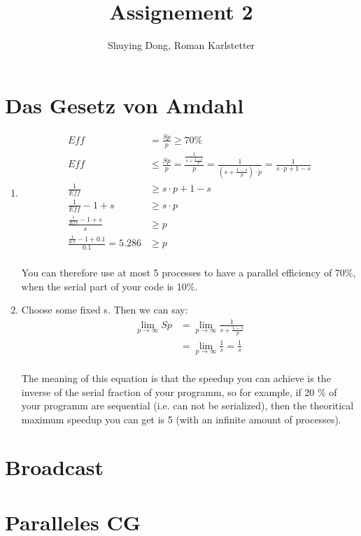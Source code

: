 \documentclass[a4paper,10pt]{article}
\title{Assignement 2}
\author{Shuying Dong, Roman Karlstetter}
\begin{document}
\section{Das Gesetz von Amdahl}
\renewcommand{\labelenumi}{\alph{enumi})}
\begin{enumerate}
 \item 
\begin{align*}
Eff &= \frac{Sp}{p} \geq 70 \% \\
Eff &\leq  \frac{Sp}{p} = \frac{\frac{1}{s+{\frac{1-s}{p}}}}{p} = \frac{1}{(s+{\frac{1-s}{p}}) \cdot p}  = \frac{1}{s\cdot p+1-s}\\
\frac{1}{Eff} &\geq  s\cdot p+1-s\\
\frac{1}{Eff} -1 + s &\geq  s\cdot p\\
\frac{\frac{1}{Eff} -1 + s}{s} &\geq  p\\
\frac{\frac{1}{0.7} -1 + 0.1}{0.1} = 5.286 &\geq  p\\
\end{align*}

You can therefore use at most 5 processes to have a parallel efficiency of 70\%, when the serial part of your code is 10\%.
\item 
Choose some fixed s. Then we can say: 
\begin{align*}
 \lim\limits_{p \rightarrow \infty}{Sp} &= \lim\limits_{p \rightarrow \infty}{\frac{1}{s+{\frac{1-s}{p}}}}\\
&= \lim\limits_{p \rightarrow \infty}{\frac{1}{s}} = \frac{1}{s}\\
\end{align*}

The meaning of this equation is that the speedup you can achieve is the inverse of the serial fraction of your programm, so for example, if 20 \% of your programm are sequential (i.e. can not be serialized), then the theoritical maximum speedup you can get is 5 (with an infinite amount of processes).



\end{enumerate}

\section{Broadcast}

\section{Paralleles CG}
\end{document}
